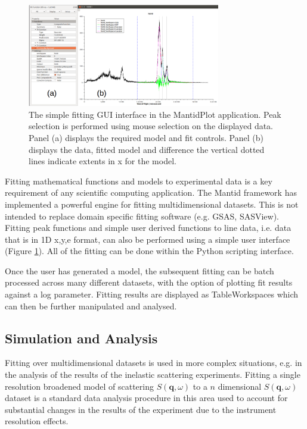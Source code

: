 \documentclass[1p]{elsarticle}
\begin{document}
\begin{figure}[!ht]
\centerline{\includegraphics[width=0.75\textwidth]{Fitting.pdf}}
\caption{The simple fitting GUI interface in the MantidPlot application. Peak selection is performed using mouse selection on the displayed data.
Panel (a) displays the required model and fit controls. Panel (b) displays the data, fitted model and difference the vertical dotted lines indicate extents in x for the model.  }
\label{fitting}
\end{figure}
Fitting mathematical functions and models to experimental data is a key requirement of any scientific computing application. 
The Mantid framework has implemented a powerful engine for fitting multidimensional datasets. This is not intended to replace domain specific fitting software (e.g. GSAS, SASView). 
 Fitting peak functions and simple user derived functions to line data, i.e. data that is in 1D x,y,e format, can also be performed using a simple user interface (Figure \ref{fitting}). All of the fitting can be done within the Python scripting  interface.

Once the user has generated a model, the subsequent fitting can be batch processed across many different datasets, with the option of plotting fit results against a log parameter. Fitting results are displayed as TableWorkspaces which can then be further manipulated and analysed.





\subsection {Simulation and Analysis}

Fitting over multidimensional datasets is used in more complex situations, e.g. in the analysis of the results of the inelastic scattering experiments. Fitting a single resolution broadened model of scattering $S(\textbf{q},\omega)$ to a $n$ dimensional $S(\textbf{q},\omega)$ dataset is a standard data analysis procedure in this area used to account for substantial changes in the results of the experiment due to the instrument resolution effects.
 
\end{document}
